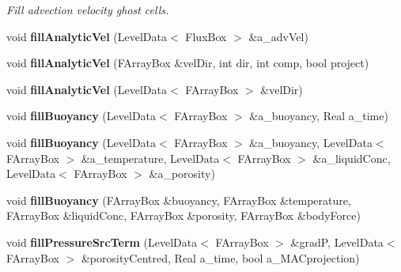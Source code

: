\begin{DoxyCompactItemize}
\begin{DoxyCompactList}\small\item\em Fill advection velocity ghost cells. \end{DoxyCompactList}\item 
\hypertarget{class_a_m_r_level_mushy_layer_a12544df6a861f6b25411c1bb88247622}{void {\bfseries fill\-Analytic\-Vel} (Level\-Data$<$ Flux\-Box $>$ \&a\-\_\-adv\-Vel)}\label{class_a_m_r_level_mushy_layer_a12544df6a861f6b25411c1bb88247622}

\item 
\hypertarget{class_a_m_r_level_mushy_layer_aa31ea2f84b91e961b747c4cc471482f6}{void {\bfseries fill\-Analytic\-Vel} (F\-Array\-Box \&vel\-Dir, int dir, int comp, bool project)}\label{class_a_m_r_level_mushy_layer_aa31ea2f84b91e961b747c4cc471482f6}

\item 
\hypertarget{class_a_m_r_level_mushy_layer_a9ec0b80e9c4c2fb7eca849a4cb37b540}{void {\bfseries fill\-Analytic\-Vel} (Level\-Data$<$ F\-Array\-Box $>$ \&vel\-Dir)}\label{class_a_m_r_level_mushy_layer_a9ec0b80e9c4c2fb7eca849a4cb37b540}

\item 
\hypertarget{class_a_m_r_level_mushy_layer_aa6503b22c51b51c10ce48907d7a97960}{void {\bfseries fill\-Buoyancy} (Level\-Data$<$ F\-Array\-Box $>$ \&a\-\_\-buoyancy, Real a\-\_\-time)}\label{class_a_m_r_level_mushy_layer_aa6503b22c51b51c10ce48907d7a97960}

\item 
\hypertarget{class_a_m_r_level_mushy_layer_af42680f8ea7ca8a032d99316025c4430}{void {\bfseries fill\-Buoyancy} (Level\-Data$<$ F\-Array\-Box $>$ \&a\-\_\-buoyancy, Level\-Data$<$ F\-Array\-Box $>$ \&a\-\_\-temperature, Level\-Data$<$ F\-Array\-Box $>$ \&a\-\_\-liquid\-Conc, Level\-Data$<$ F\-Array\-Box $>$ \&a\-\_\-porosity)}\label{class_a_m_r_level_mushy_layer_af42680f8ea7ca8a032d99316025c4430}

\item 
\hypertarget{class_a_m_r_level_mushy_layer_a33522b27aabe2763e57c66c2ab4e2e09}{void {\bfseries fill\-Buoyancy} (F\-Array\-Box \&buoyancy, F\-Array\-Box \&temperature, F\-Array\-Box \&liquid\-Conc, F\-Array\-Box \&porosity, F\-Array\-Box \&body\-Force)}\label{class_a_m_r_level_mushy_layer_a33522b27aabe2763e57c66c2ab4e2e09}

\item 
\hypertarget{class_a_m_r_level_mushy_layer_a7e993cb0263c611cd4062a720e9674d2}{void {\bfseries fill\-Pressure\-Src\-Term} (Level\-Data$<$ F\-Array\-Box $>$ \&grad\-P, Level\-Data$<$ F\-Array\-Box $>$ \&porosity\-Centred, Real a\-\_\-time, bool a\-\_\-\-M\-A\-Cprojection)}\label{class_a_m_r_level_mushy_layer_a7e993cb0263c611cd4062a720e9674d2}


\end{DoxyCompactItemize}
